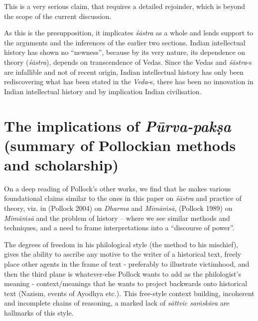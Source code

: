 This is a very serious claim, that requires a detailed rejoinder, which is beyond the scope of the current discussion. 

As this is the presupposition, it implicates {\sl śāstra} as a whole and lends support to the arguments and the inferences of the earlier two sections. Indian intellectual history has shown no ``newness'', because by its very nature, its dependence on theory ({\sl śāstra}), depends on transcendence of Vedas.  Since the Vedas and {\sl śāstra}-s are infallible and not of recent origin, Indian intellectual history has only been rediscovering what has been stated in the {\sl Veda}-s, there has been no innovation in Indian intellectual history and by implication Indian civilisation.

\section*{The implications of {{\sl\bfseries Pūrva-pakṣa}\relax} (summary of Pollockian methods and scholarship)}

On a deep reading of Pollock's other works, we find that he makes various foundational claims similar to the ones in this paper on {\sl śāstra} and practice of theory, viz. in (Pollock 2004) on {\sl Dharma} and {\sl Mīmāṁsā}, (Pollock 1989) on {\sl Mīmāṁsā} and the problem of history -- where we see similar methods and techniques, and a need  to frame interpretations into a ``discourse of power''.

The degrees of freedom in his philological style (the method to his mischief), gives the ability to ascribe any motive to the writer of a historical text, freely place other agents in the frame of text - preferably to illustrate victimhood, and then the third plane is whatever-else Pollock wants to add as the philologist's meaning - context/meanings that he wants to project backwards onto historical text (Nazism, events of Ayodhya etc.). This free-style context building, incoherent and incomplete chains of reasoning, a marked lack of {\sl sāttvic saṁskāra} are hallmarks of this style. 

